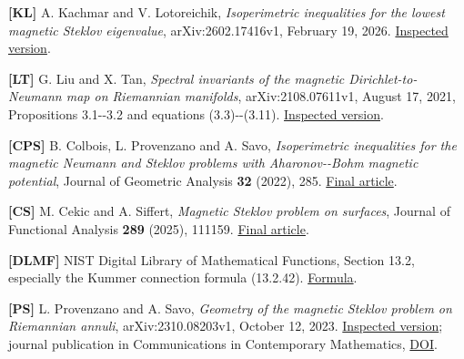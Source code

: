 \documentclass[11pt]{article}
\begin{document}
\textbf{{[}KL{]}} A. Kachmar and V. Lotoreichik, \emph{Isoperimetric
inequalities for the lowest magnetic Steklov eigenvalue},
arXiv:2602.17416v1, February 19, 2026.
\href{https://arxiv.org/html/2602.17416v1}{Inspected version}.

\textbf{{[}LT{]}} G. Liu and X. Tan, \emph{Spectral invariants of the
magnetic Dirichlet-to-Neumann map on Riemannian manifolds},
arXiv:2108.07611v1, August 17, 2021, Propositions 3.1-\/-3.2 and
equations (3.3)-\/-(3.11).
\href{https://arxiv.org/html/2108.07611v1}{Inspected version}.

\textbf{{[}CPS{]}} B. Colbois, L. Provenzano and A. Savo,
\emph{Isoperimetric inequalities for the magnetic Neumann and Steklov
problems with Aharonov-\/-Bohm magnetic potential}, Journal of Geometric
Analysis \textbf{32} (2022), 285.
\href{https://doi.org/10.1007/s12220-022-01001-2}{Final article}.

\textbf{{[}CS{]}} M. Cekic and A. Siffert, \emph{Magnetic Steklov
problem on surfaces}, Journal of Functional Analysis \textbf{289}
(2025), 111159. \href{https://doi.org/10.1016/j.jfa.2025.111159}{Final
article}.

\textbf{{[}DLMF{]}} NIST Digital Library of Mathematical Functions,
Section 13.2, especially the Kummer connection formula (13.2.42).
\href{https://dlmf.nist.gov/13.2.E42}{Formula}.

\textbf{{[}PS{]}} L. Provenzano and A. Savo, \emph{Geometry of the
magnetic Steklov problem on Riemannian annuli}, arXiv:2310.08203v1,
October 12, 2023. \href{https://arxiv.org/html/2310.08203v1}{Inspected
version}; journal publication in Communications in Contemporary
Mathematics, \href{https://doi.org/10.1142/S0219199725500014}{DOI}.
\end{document}
